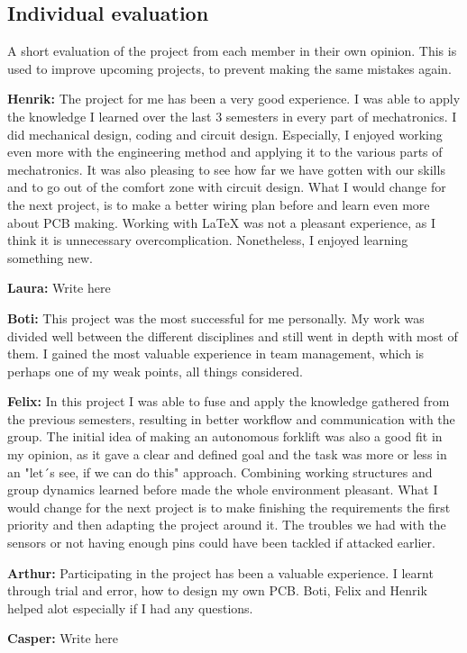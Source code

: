 \documentclass[../report.tex]{subfiles}
\begin{document}
\subsection{Individual evaluation}
A short evaluation of the project from each member in their own opinion. This is used to improve
upcoming projects, to prevent making the same mistakes again.

\textbf{Henrik:}
The project for me has been a very good experience. I was able to apply the knowledge
I learned over the last 3 semesters in every part of mechatronics. I did mechanical
design, coding and circuit design. Especially, I enjoyed working even more
with the engineering method and applying it to the various parts of mechatronics. 
It was also pleasing to see how far we have gotten with our skills and to go out of the comfort zone with circuit design. What I would change for the
next project, is to make a better wiring plan before and learn even more about PCB making.
Working with LaTeX was not a pleasant
experience, as I think it is unnecessary overcomplication. Nonetheless, I enjoyed learning something new.


\textbf{Laura:}
Write here

\textbf{Boti:}
This project was the most successful for me personally. My work was divided well between the different disciplines
and still went in depth with most of them. I gained the most valuable experience in team management, which is perhaps one of
my weak points, all things considered.

\textbf{Felix:}
In this project I was able to fuse and apply the knowledge gathered from the previous semesters, resulting in better 
workflow and communication with the group. The initial idea of making an autonomous forklift was also a good fit 
in my opinion, as it gave a clear and defined goal and the task was more or less in an "let´s see, if we can do this" 
approach. Combining working structures and group dynamics learned before made the whole environment pleasant.  What I would 
change for the next project is to make finishing the requirements the first priority and then adapting the project around it. 
The troubles we had with the sensors or not having enough pins could have been tackled if attacked earlier.



\textbf{Arthur:}
Participating in the project has been a valuable experience. I learnt through trial and error, how to design my own PCB. Boti, Felix and Henrik helped alot especially if I had any questions. 


\textbf{Casper:}
Write here
\end{document}

